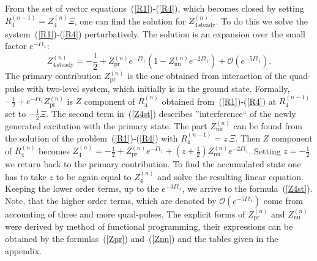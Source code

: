 \documentclass[prb,twocolumn,showpacs,epsfig,epsf]{revtex4}
\newcommand{\1}{\mathds{1}}
\begin{document}
From the set of vector equations~(\ref{R1})-(\ref{R4}), which becomes closed by setting $R_4^{(n-1)}= Z_4^{(n)}\Xi$, one can find the solution for $Z_{4\,\mathrm{steady}}^{(n)}$. To do this we solve  the system~(\ref{R1})-(\ref{R4}) perturbatively. The solution is an expansion over the small factor $e^{-\Gamma t_1}$:
\begin{equation}\label{Z4st}
Z_{4\,\mathrm{steady}}^{(n)}=-\frac{1}{2}+Z_{\mathrm{pr}}^{(n)}e^{-\Gamma t_1}\left(1-Z_{\mathrm{nu}}^{(n)} e^{-2\Gamma t_1}\right)+\mathcal{O}(e^{-5\Gamma t_1}).
\end{equation}
The primary contribution $Z_{\mathrm{pr}}^{(n)}$ is the one obtained from interaction of the quad-pulse with two-level system, which initially is in the ground state. Formally,  $-\frac{1}{2}+e^{-\Gamma t_1} Z_{\mathrm{pr}}^{(n)}$ is $Z$ component of $R_4^{(n)}$ obtained from~(\ref{R1})-(\ref{R4}) at $R_4^{(n-1)}$ set to $-\frac{1}{2}\Xi$. The second term in~(\ref{Z4st}) describes ''interference`` of the newly generated excitation with the primary state. The part $Z_{\mathrm{nu}}^{(n)}$ can be found from the solution of the problem~(\ref{R1})-(\ref{R4}) with $R_4^{(n-1)}= z\,\Xi$. Then $Z$ component of  $R_4^{(n)}$ becomes $Z_4^{(n)}=-\frac{1}{2}+Z_{\mathrm{pr}}^{(n)}e^{-\Gamma t_1}+\left(z+\frac{1}{2}\right) Z_{\mathrm{nu}}^{(n)} e^{-2\Gamma t_1}$. Setting $z=-\frac{1}{2}$ we return back to the primary contribution. To find the accumulated state one has to take $z$ to be again equal to $Z_4^{(n)}$ and solve the resulting linear equation. Keeping the lower order terms, up to the $e^{-3\Gamma t_1}$, we arrive to the formula~(\ref{Z4st}). Note, that the higher order terms, which are denoted by $\mathcal{O}(e^{-5\Gamma t_1})$ come from accounting of three and more quad-pulses. The explicit forms of $Z_{\mathrm{pr}}^{(n)}$ and $Z_{\mathrm{nu}}^{(n)}$ were derived by method of functional programming, their expressions can be obtained by the formulas~(\ref{Zpr}) and~(\ref{Znu}) and the tables given in the appendix. 
\end{document}
